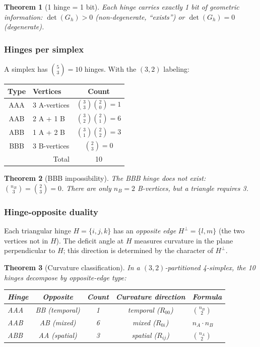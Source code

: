 \documentclass[12pt]{article}
\newtheorem{theorem}{Theorem}[section]
\theoremstyle{remark}
\theoremstyle{definition}
\begin{document}
\begin{theorem}[1 hinge = 1 bit]
\label{thm:hinge_bit}
Each hinge carries exactly 1 bit of geometric information: $\det(G_h) > 0$ (non-degenerate, ``exists'') or $\det(G_h) = 0$ (degenerate).
\end{theorem}

\subsubsection{Hinges per simplex}

A simplex has $\binom{5}{3} = 10$ hinges. With the $(3,2)$ labeling:

\begin{center}
\begin{tabular}{clc}
\hline
Type & Vertices & Count \\
\hline
AAA & 3 A-vertices & $\binom{3}{3}\binom{2}{0} = 1$ \\
AAB & 2 A + 1 B & $\binom{3}{2}\binom{2}{1} = 6$ \\
ABB & 1 A + 2 B & $\binom{3}{1}\binom{2}{2} = 3$ \\
BBB & 3 B-vertices & $\binom{2}{3} = 0$ \\
\hline
\multicolumn{2}{r}{Total} & 10 \\
\hline
\end{tabular}
\end{center}

\begin{theorem}[BBB impossibility]
\label{thm:bbb}
The BBB hinge does not exist: $\binom{n_B}{3} = \binom{2}{3} = 0$. There are only $n_B = 2$ B-vertices, but a triangle requires 3.
\end{theorem}

\subsubsection{Hinge-opposite duality}
\label{sec:hinge_opposite}

Each triangular hinge $H = \{i,j,k\}$ has an \emph{opposite edge} $H^\perp = \{l,m\}$ (the two vertices not in $H$).  The deficit angle at $H$ measures curvature in the plane perpendicular to $H$; this direction is determined by the character of $H^\perp$.

\begin{theorem}[Curvature classification]
\label{thm:opposite}
In a $(3,2)$-partitioned 4-simplex, the 10 hinges decompose by opposite-edge type:
\begin{center}
\begin{tabular}{lcccl}
\toprule
Hinge & Opposite & Count & Curvature direction & Formula \\
\midrule
AAA & BB (temporal) & 1 & temporal ($R_{00}$) & $\binom{n_B}{2}$ \\
AAB & AB (mixed)    & 6 & mixed ($R_{0i}$)    & $n_A \cdot n_B$ \\
ABB & AA (spatial)  & 3 & spatial ($R_{ij}$)   & $\binom{n_A}{2}$ \\
\bottomrule
\end{tabular}
\end{center}
\end{theorem}
\end{document}
